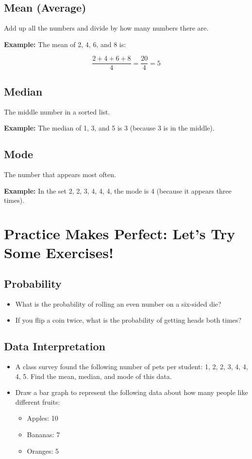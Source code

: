 \subsection{Mean (Average)}
Add up all the numbers and divide by how many numbers there are.

\textbf{Example:} The mean of 2, 4, 6, and 8 is:

\[
\frac{2 + 4 + 6 + 8}{4} = \frac{20}{4} = 5
\]

\subsection{Median}
The middle number in a sorted list.

\textbf{Example:} The median of 1, 3, and 5 is 3 (because 3 is in the middle).

\subsection{Mode}
The number that appears most often.

\textbf{Example:} In the set 2, 2, 3, 4, 4, 4, the mode is 4 (because it appears three times).

\section{Practice Makes Perfect: Let’s Try Some Exercises!}
\subsection{Probability}
\begin{itemize}
    \item What is the probability of rolling an even number on a six-sided die?
    \item If you flip a coin twice, what is the probability of getting heads both times?
\end{itemize}

\subsection{Data Interpretation}
\begin{itemize}
    \item A class survey found the following number of pets per student: 1, 2, 2, 3, 4, 4, 4, 5. Find the mean, median, and mode of this data.
    \item Draw a bar graph to represent the following data about how many people like different fruits:
    \begin{itemize}
        \item Apples: 10
        \item Bananas: 7
        \item Oranges: 5
    \end{itemize}
\end{itemize}

